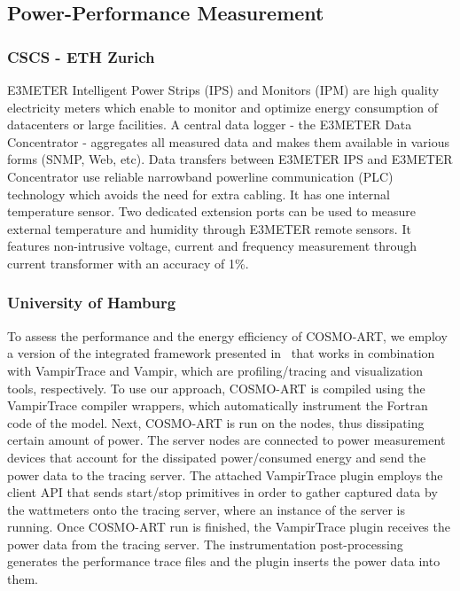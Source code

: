 \subsection{Power-Performance Measurement}
\label{subsec:2.2}

\subsubsection{CSCS - ETH Zurich}
E3METER  Intelligent Power Strips  (IPS) and  Monitors (IPM)  are high
quality electricity meters which enable to monitor and optimize energy
consumption of datacenters or large facilities.  A central data logger
- the  E3METER Data Concentrator  - aggregates  all measured  data and
makes them available in various forms (SNMP, Web, etc). Data transfers
between E3METER  IPS and E3METER Concentrator  use reliable narrowband
powerline  communication (PLC)  technology which  avoids the  need for
extra cabling.  It has  one internal temperature sensor. Two dedicated
extension  ports  can be  used  to  measure  external temperature  and
humidity  through E3METER  remote sensors.  It  features non-intrusive
voltage, current and frequency measurement through current transformer
with an accuracy of 1\%.

\subsubsection{University of Hamburg}
To assess the  performance and the energy efficiency  of COSMO-ART, we
employ   a    version   of   the    integrated   framework   presented
in~\cite{energy13}  that  works in  combination  with VampirTrace  and
Vampir,   which  are   profiling/tracing   and  visualization   tools,
respectively.
To  use our  approach,  COSMO-ART is  compiled  using the  VampirTrace
compiler wrappers, which automatically  instrument the Fortran code of
the  model. Next,  COSMO-ART is  run  on the  nodes, thus  dissipating
certain  amount of  power.  The  server nodes  are connected  to power
measurement  devices that  account for  the  dissipated power/consumed
energy and  send the power data  to the tracing  server.  The attached
VampirTrace \pmlib plugin employs the client API that sends start/stop
primitives in order to gather captured data by the wattmeters onto the
tracing server,  where an  instance of the  \pmlib server  is running.
Once COSMO-ART run is finished, the VampirTrace \pmlib plugin receives
the  power   data  from  the  tracing   server.   The  instrumentation
post-processing generates  the performance trace files  and the \pmlib
plugin inserts the power data into them.

